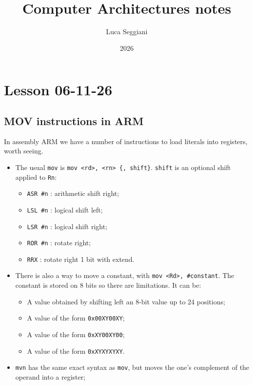 \documentclass[a4paper,11pt]{article}
\title{Computer Architectures notes}
\author{Luca Seggiani}
\date{2026}
\begin{document}
\section{Lesson 06-11-26}

\thispagestyle{empty}
\pagestyle{fancy}

\subsection{MOV instructions in ARM}

In assembly ARM we have a number of instructions to load literals into registers, worth seeing.

\begin{itemize}
	\item The usual \texttt{mov} is \texttt{mov <rd>, <rn> \{, shift\}}. \texttt{shift} is an optional shift applied to \texttt{Rn}:
	      \begin{itemize}
		      \item \texttt{ASR \#n} : arithmetic shift right;
		      \item \texttt{LSL \#n} : logical shift left;
		      \item \texttt{LSR \#n} : logical shift right;
		      \item \texttt{ROR \#n} : rotate right;
		      \item \texttt{RRX} : rotate right 1 bit with extend.
	      \end{itemize}

	\item There is also a way to move a constant, with \texttt{mov <Rd>, \#constant}.
	      The constant is stored on 8 bits so there are limitations. It can be:
	      \begin{itemize}
		      \item A value obtained by shifting left an 8-bit value up to 24 positions;
		      \item A value of the form \texttt{0x00XY00XY};
		      \item A value of the form \texttt{0xXY00XY00};
		      \item A value of the form \texttt{0xXYXYXYXY}.
	      \end{itemize}
	\item \texttt{mvn} has the same exact syntax as \texttt{mov}, but  moves the one’s complement of the operand into a register;


\end{itemize}
\end{document}
